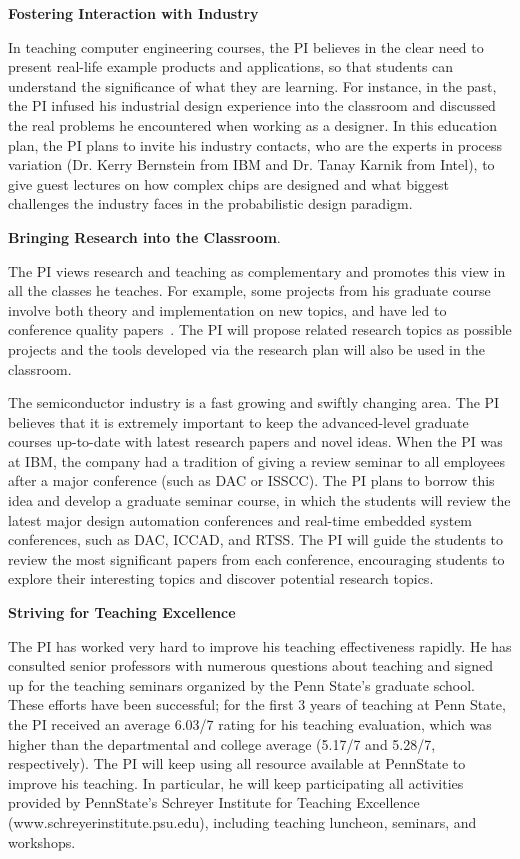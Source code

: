 \item{\bf Fostering Interaction with Industry}

In teaching computer engineering courses, the PI believes in the
clear need to present real-life example products and applications,
so that students can understand the significance of what they are
learning. For instance, in the past, the PI infused his industrial
design experience into the classroom and discussed the real
problems he encountered when working as a designer. In this
education plan, the PI plans to invite his industry contacts, who
are the experts in process variation (Dr. Kerry Bernstein from IBM
and Dr. Tanay Karnik from Intel), to give guest lectures on how
complex chips are designed and what biggest challenges the
industry faces in the probabilistic design paradigm.

\item{\bf Bringing Research into the Classroom}.

The PI views research and teaching as complementary and promotes
this view in all the classes he teaches. For example, some
projects from his graduate course involve both theory and
implementation on new topics, and have led to conference quality
papers~\cite{xie:islped04,xie:isvlsi05, xie:asic05}. The PI will
propose related research topics as possible projects and the tools
developed via the research plan will also be used in the
classroom.



 The semiconductor industry is a fast growing
and swiftly changing area. The PI believes that it is extremely
important to keep the advanced-level graduate courses up-to-date
with latest research papers and novel ideas. When the PI was at IBM,
the company had a tradition of giving a review seminar to all
employees after a major conference (such as DAC or ISSCC). The PI
plans to borrow this idea and develop a graduate seminar course, in
which the students will review the latest major design automation
conferences and real-time embedded system conferences, such as DAC,
ICCAD, and RTSS. The PI will guide the students to review the most
significant papers from each conference, encouraging students to
explore their interesting topics and discover potential research
topics.

\item{\bf Striving for Teaching Excellence}

The PI has worked very hard to improve his teaching effectiveness
rapidly. He has consulted senior professors with numerous
questions about teaching and signed up for the teaching seminars
organized by the Penn State's graduate school. These efforts have
been successful; for the first 3 years of teaching at Penn State,
the PI received an average 6.03/7 rating for his teaching
evaluation, which was higher than the departmental and college
average (5.17/7 and 5.28/7, respectively). The PI will keep using
all resource available at PennState to improve his teaching. In
particular, he will keep participating all activities provided by
PennState's Schreyer Institute for Teaching Excellence
(www.schreyerinstitute.psu.edu), including teaching luncheon,
seminars, and workshops.

